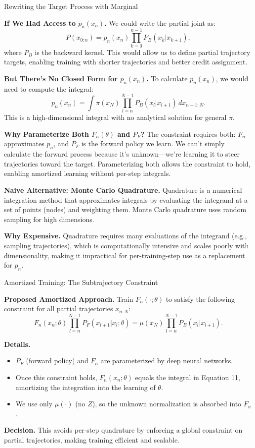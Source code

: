 \documentclass[aspectratio=169,xcolor=dvipsnames]{beamer}
\begin{document}
\begin{frame}[t]{Rewriting the Target Process with Marginal}
\tiny

\textbf{If We Had Access to $p_n(x_n)$.} We could write the partial joint as:
\[
P(x_{0:n}) = p_n(x_n) \prod_{k=0}^{n-1} P_B(x_k | x_{k+1}),
\]
where $P_B$ is the backward kernel. This would allow us to define partial trajectory targets, enabling training with shorter trajectories and better credit assignment.

\textbf{But There's No Closed Form for $p_n(x_n)$.} To calculate $p_n(x_n)$, we would need to compute the integral:
\[
p_n(x_n) = \int \pi(x_N) \prod_{l=n}^{N-1} P_B(x_l | x_{l+1}) \, dx_{n+1:N}.
\]
This is a high-dimensional integral with no analytical solution for general $\pi$.

\textbf{Why Parameterize Both $F_n(\theta)$ and $P_F$?} The constraint requires both: $F_n$ approximates $p_n$, and $P_F$ is the forward policy we learn. We can't simply calculate the forward process because it's unknown—we're learning it to steer trajectories toward the target. Parameterizing both allows the constraint to hold, enabling amortized learning without per-step integrals.

\textbf{Naive Alternative: Monte Carlo Quadrature.} Quadrature is a numerical integration method that approximates integrals by evaluating the integrand at a set of points (nodes) and weighting them. Monte Carlo quadrature uses random sampling for high dimensions.

\textbf{Why Expensive.} Quadrature requires many evaluations of the integrand (e.g., sampling trajectories), which is computationally intensive and scales poorly with dimensionality, making it impractical for per-training-step use as a replacement for $p_n$.

\end{frame}

\begin{frame}[t]{Amortized Training: The Subtrajectory Constraint}
\footnotesize

\textbf{Proposed Amortized Approach.} Train $F_n(\cdot; \theta)$ to satisfy the following constraint for all partial trajectories $x_{n:N}$:
\[
F_n(x_n; \theta) \prod_{l=n}^{N-1} P_F(x_{l+1} | x_l; \theta) = \mu(x_N) \prod_{l=n}^{N-1} P_B(x_l | x_{l+1}).
\]

\textbf{Details.}
\begin{itemize}\itemsep2pt
  \item $P_F$ (forward policy) and $F_n$ are parameterized by deep neural networks.
  \item Once this constraint holds, $F_n(x_n; \theta)$ equals the integral in Equation 11, amortizing the integration into the learning of $\theta$.
  \item We use only $\mu(\cdot)$ (no $Z$), so the unknown normalization is absorbed into $F_n$.
\end{itemize}

\textbf{Decision.} This avoids per-step quadrature by enforcing a global constraint on partial trajectories, making training efficient and scalable.

\end{frame}
\end{document}
